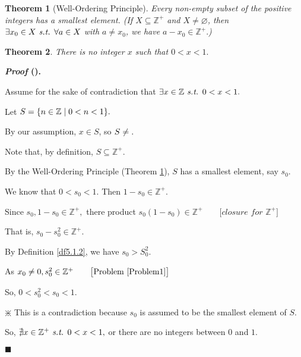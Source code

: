 \documentclass[12pt,a4paper]{article}
\newtheorem{thm}{Theorem}[subsection]
\newcounter{nprf}[subsection]
\newenvironment*{prf}{\par\indent\textbf{\textit{Proof} (\stepcounter{nprf}\thenprf). }\par }{\par\hfill $\blacksquare$\par}
\def\Z{{\mathbb{Z}}}
\def\Zp{{\Z^{+}}}
\def\emptyset{\varnothing}
\def\st{\emph{ s.t. }}
\begin{document}
\begin{thm}[Well-Ordering Principle]\label{thm5.1.1}
	Every non-empty subset of the positive integers has a smallest element. 	(If $X\subseteq\Zp$ and $X\neq\emptyset$, then $\exists x_0\in X\st\forall a\in X$ with $a\neq x_0$, we have $a-x_0\in\Zp.$)
\end{thm}
\begin{framed}
\begin{thm}\label{thm5.1.2}
	There is no integer $x$ such that $0<x<1.$	
\end{thm}
\begin{prf}
	Assume for the sake of contradiction that $\exists x\in\Z\st0<x<1.$\par Let $S=\qty{n\in\Z\mid0<n<1}.$\par By our assumption, $x\in S$, so $S\neq\empty.$\par Note that, by definition, $S\subseteq\Zp$.\par  By the Well-Ordering Principle (Theorem \ref{thm5.1.1}), $S$ has a smallest element, say $s_0$.\par We know that $0<s_0<1$. Then $1-s_0\in\Zp.$\par Since $s_0,1-s_0\in\Zp,$ there product $s_0(1-s_0)\in\Zp\qquad\big[\textit{closure for $\Zp$}\big]$\par That is, $s_0-s_0^2\in\Zp.$\par By Definition \ref{df5.1.2}, we have $s_0>S_0^2.$\par As $x_0\neq0, s_0^2\in\Zp\qquad\big[\text{Problem \ref{Problem1}}\big]$\par So, $0<s_0^2<s_0<1.$\par\begin{center}$\divideontimes$ This is a contradiction because $s_0$ is assumed to be the smallest element of $S$.\end{center}\par So, $\nexists x\in\Zp\st0<x<1,$ or there are no integers between $0$ and $1$.
\end{prf}
\end{framed}
\end{document}
